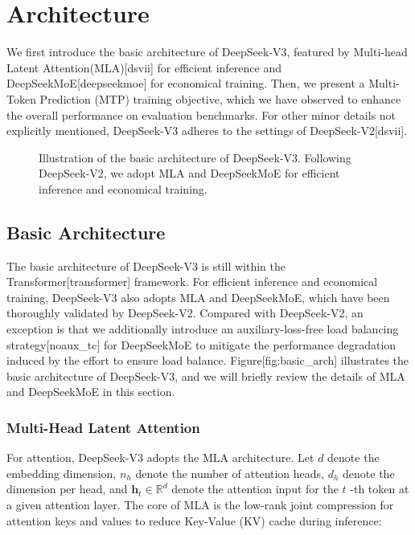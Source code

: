 \documentclass[11pt,a4paper]{article}
\begin{document}
\section{Architecture}

We first introduce the basic architecture of DeepSeek-V3, featured by Multi-head Latent Attention(MLA)[dsvii] for efficient inference and DeepSeekMoE[deepseekmoe] for economical training. Then, we present a Multi-Token Prediction (MTP) training objective, which we have observed to enhance the overall performance on evaluation benchmarks. For other minor details not explicitly mentioned, DeepSeek-V3 adheres to the settings of DeepSeek-V2[dsvii].

\begin{figure}[h]
\caption{Illustration of the basic architecture of DeepSeek-V3. Following DeepSeek-V2, we adopt MLA and DeepSeekMoE for efficient inference and economical training.}
\end{figure}

\subsection{Basic Architecture}

The basic architecture of DeepSeek-V3 is still within the Transformer[transformer] framework. For efficient inference and economical training, DeepSeek-V3 also adopts MLA and DeepSeekMoE, which have been thoroughly validated by DeepSeek-V2. Compared with DeepSeek-V2, an exception is that we additionally introduce an auxiliary-loss-free load balancing strategy[noaux\_tc] for DeepSeekMoE to mitigate the performance degradation induced by the effort to ensure load balance. Figure[fig:basic\_arch] illustrates the basic architecture of DeepSeek-V3, and we will briefly review the details of MLA and DeepSeekMoE in this section.

\subsubsection{Multi-Head Latent Attention}

For attention, DeepSeek-V3 adopts the MLA architecture. Let  $d$  denote the embedding dimension,  $n_h$  denote the number of attention heads,  $d_h$  denote the dimension per head, and  $\mathbf{h}_{t} \in \mathbb{R}^{d}$  denote the attention input for the  $t$ -th token at a given attention layer. The core of MLA is the low-rank joint compression for attention keys and values to reduce Key-Value (KV) cache during inference:
\end{document}
